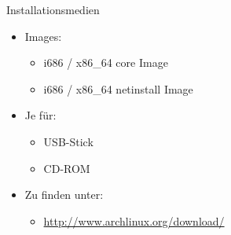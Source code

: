 
\begin{slide}{Installationsmedien}
	\begin{itemize}
		\item{Images:
			\begin{itemize}
				\item{i686 / x86\_64 core Image}
				\item{i686 / x86\_64 netinstall Image}
			\end{itemize}
		}
		
		\item{Je f\"{u}r:
			\begin{itemize}
				\item{USB-Stick}
				\item{CD-ROM}
			\end{itemize}
		}
		\item{Zu finden unter:
			\begin{itemize}
				\item{\url{http://www.archlinux.org/download/}}
			\end{itemize}
		}
	\end{itemize}
\end{slide}

